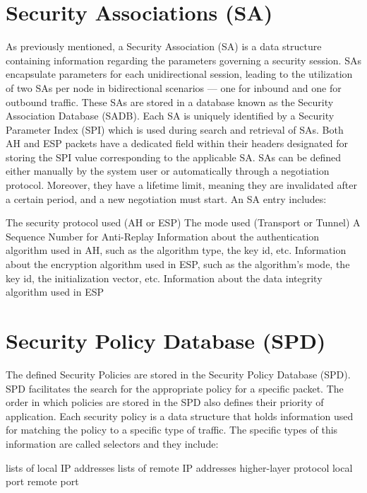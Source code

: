 \section{Security Associations (SA)}
As previously mentioned, a Security Association (SA) is a data structure containing information regarding the parameters governing a security session. SAs encapsulate parameters for each unidirectional session, leading to the utilization of two SAs per node in bidirectional scenarios — one for inbound and one for outbound traffic. These SAs are stored in a database known as the Security Association Database (SADB). Each SA is uniquely identified by a Security Parameter Index (SPI) which is used during search and retrieval of SAs. Both AH and ESP packets have a dedicated field within their headers designated for storing the SPI value corresponding to the applicable SA. SAs can be defined either manually by the system user or automatically through a negotiation protocol. Moreover, they have a lifetime limit, meaning they are invalidated after a certain period, and a new negotiation must start. An SA entry includes:
\begin{outline}
\1 The security protocol used (AH or ESP)
\1 The mode used (Transport or Tunnel)
\1 A Sequence Number for Anti-Replay
\1 Information about the authentication algorithm used in AH, such as the algorithm type, the key id, etc.
\1 Information about the encryption algorithm used in ESP, such as the algorithm's mode, the key id, the initialization vector, etc.
\1 Information about the data integrity algorithm used in ESP
\end{outline}

\section{Security Policy Database (SPD)}
The defined Security Policies are stored in the Security Policy Database (SPD). SPD facilitates the search for the appropriate policy for a specific packet. The order in which policies are stored in the SPD also defines their priority of application. Each security policy is a data structure that holds information used for matching the policy to a specific type of traffic. The specific types of this information are called selectors and they include:
\begin{outline}
\1 lists of local IP addresses
\1 lists of remote IP addresses
\1 higher-layer protocol
\1 local port
\1 remote port
\end{outline}

